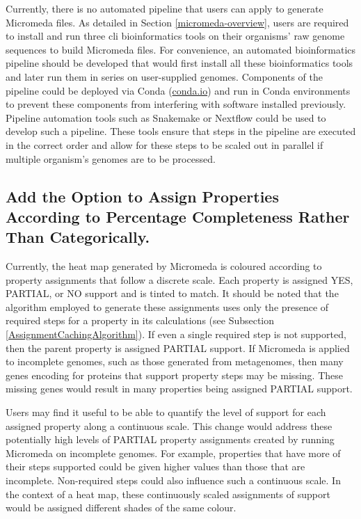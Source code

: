 Currently, there is no automated pipeline that users can apply to generate 
Micromeda files. As detailed in Section \ref{micromeda-overview}, users are 
required to install and run three \gls{cli} bioinformatics tools on their 
organisms' raw genome sequences to build Micromeda files. For convenience, an 
automated bioinformatics pipeline should be developed that would first install 
all these bioinformatics tools and later run them in series on user-supplied 
genomes. Components of the pipeline could be deployed via Conda 
(\href{http://conda.io}{conda.io}) and run in Conda environments to prevent 
these components from interfering with software installed previously. Pipeline 
automation tools such as Snakemake \cite{koster2012snakemake} or Nextflow 
\cite{di2017nextflow} could be used to develop such a pipeline. These tools 
ensure that steps in the pipeline are executed in the correct order and allow 
for these steps to be scaled out in parallel if multiple organism's genomes are 
to be processed.

\subsection{Add the Option to Assign Properties According to Percentage 
Completeness Rather Than Categorically.}

Currently, the heat map generated by Micromeda is coloured according to property 
assignments that follow a discrete scale. Each property is assigned YES, 
PARTIAL, or NO support and is tinted to match. It should be noted that the 
algorithm employed to generate these assignments uses only the presence of 
required steps for a property in its calculations (see Subsection 
\ref{AssignmentCachingAlgorithm}). If even a single required step is not 
supported, then the parent property is assigned PARTIAL support. If Micromeda is 
applied to incomplete genomes, such as those generated from metagenomes, then 
many genes encoding for proteins that support property steps may be missing. 
These missing genes would result in many properties being assigned PARTIAL 
support. 

Users may find it useful to be able to quantify the level of support for each 
assigned property along a continuous scale. This change would address these 
potentially high levels of PARTIAL property assignments created by running 
Micromeda on incomplete genomes. For example, properties that have more of their 
steps supported could be given higher values than those that are incomplete. 
Non-required steps could also influence such a continuous scale. In the context 
of a heat map, these continuously scaled assignments of support would be 
assigned different shades of the same colour.

